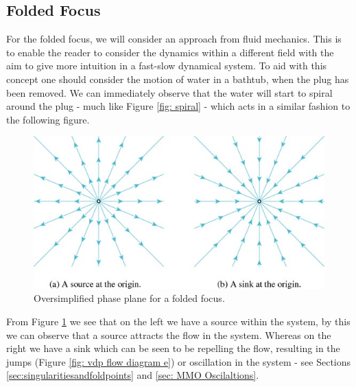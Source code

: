 \subsection{Folded Focus}
\label{a: sinksource}
For the folded focus, we will consider an approach from fluid mechanics. This is to enable the reader to consider the dynamics within a different field with the aim to give more intuition in a fast-slow dynamical system. To aid with this concept one should consider the motion of water in a bathtub, when the plug has been removed. We can immediately observe that the water will start to spiral around the plug - much like Figure \ref{fig: spiral} - which acts in a similar fashion to the following figure. 
\begin{figure}[h!]
	\centering
	\includegraphics[width=0.7\linewidth]{Images/sourcesink}
	\caption{Oversimplified phase plane for a folded focus.}
	\label{fig:source-sink}
\end{figure}
From Figure \ref{fig:source-sink} we see that on the left we have a source within the system, by this we can observe that a source attracts the flow in the system. Whereas on the right we have a sink which can be seen to be repelling the flow, resulting in the jumps (Figure \ref{fig: vdp flow diagram e}) or oscillation in the system - see Sections \ref{sec:singularitiesandfoldpoints} and \ref{sec: MMO Oscilaltions}. 